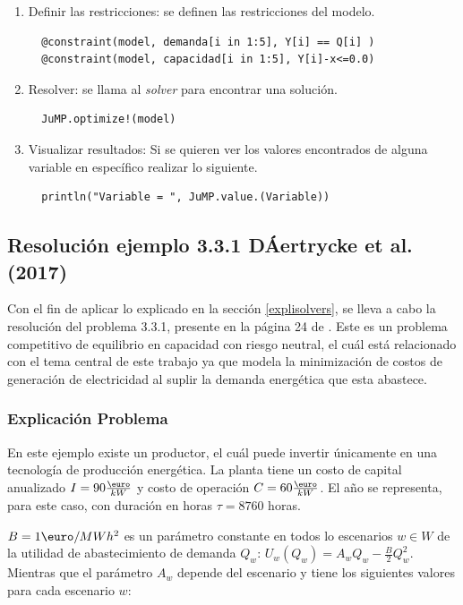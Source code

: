 \begin{enumerate}
  \item Definir las restricciones: se definen las restricciones del modelo.
  \begin{lstlisting}
  @constraint(model, demanda[i in 1:5], Y[i] == Q[i] )
  @constraint(model, capacidad[i in 1:5], Y[i]-x<=0.0)
  \end{lstlisting}
  
  \item  Resolver: se llama al \textit{solver} para encontrar una solución. 
  \begin{lstlisting}
  JuMP.optimize!(model)
  \end{lstlisting}
  
  \item Visualizar resultados: Si se quieren ver los valores encontrados de alguna variable en específico realizar lo siguiente.
  \begin{lstlisting}
  println("Variable = ", JuMP.value.(Variable))
  \end{lstlisting}
\end{enumerate}



\subsection{Resolución ejemplo 3.3.1 DÁertrycke et al. (2017)}

Con el fin de aplicar lo explicado en la sección \ref{explisolvers}, se lleva a cabo la resolución del problema 3.3.1, presente en la página 24 de . Este es un problema competitivo de equilibrio en capacidad con riesgo neutral, el cuál está relacionado con el tema central de este trabajo ya que modela la minimización de costos de generación de electricidad al suplir la demanda energética que esta abastece. 
\vspace{2.5mm}

\subsubsection{Explicación Problema}
En este ejemplo existe un productor, el cuál puede invertir únicamente en una tecnología de producción energética. La planta tiene un costo de capital anualizado $I=90 \frac{\textup{\euro}}{kW}$ y costo de operación $C=60 \frac{\textup{\euro}}{kW}$. El año se representa, para este caso, con duración en horas $\tau = 8760$ horas. 
\vspace{2.5mm}

$B = 1\textup{\euro}/MWh^2$ es un parámetro constante en todos lo escenarios $w \in W$ de la utilidad de abastecimiento de demanda $Q_w$: $U_w(Q_w) = A_wQ_w-\frac{B}{2}Q_w^2$. Mientras que el parámetro $A_w$ depende del escenario y tiene los siguientes valores para cada escenario $w$:

